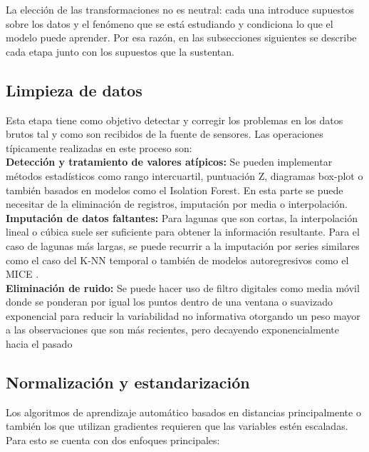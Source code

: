 La elección de las transformaciones no es neutral: cada una introduce supuestos sobre los datos y el fenómeno que se está estudiando y condiciona lo que el modelo puede aprender. Por esa razón, en las subsecciones siguientes se describe cada etapa junto con los supuestos que la sustentan.

\subsection{Limpieza de datos}

Esta etapa tiene como objetivo detectar y corregir los problemas en los datos brutos tal y como son recibidos de la fuente de sensores. Las operaciones típicamente realizadas en este proceso son:\\[.15cm]

\textbf{Detección y tratamiento de valores atípicos:} Se pueden implementar métodos estadísticos como rango intercuartil, puntuación Z, diagramas box-plot o también basados en modelos como el Isolation Forest. En esta parte se puede necesitar de la eliminación de registros, imputación por media o interpolación.\\[.15cm]

\textbf{Imputación de datos faltantes:} Para lagunas que son cortas, la interpolación lineal o cúbica suele ser suficiente para obtener la información resultante. Para el caso de lagunas más largas, se puede recurrir a la imputación por series similares como el caso del K-NN temporal \cite{oehmcke2016} o también de modelos autoregresivos como el MICE \cite{vanbuuren2011}.\\[.15cm]

\textbf{Eliminación de ruido:} Se puede hacer uso de filtro digitales como media móvil donde se ponderan por igual los puntos dentro de una ventana o suavizado exponencial para reducir la variabilidad no informativa otorgando un peso mayor a las observaciones que son más recientes, pero decayendo exponencialmente hacia el pasado \cite{nielsen2019}\\[.15cm]

\subsection{Normalización y estandarización}

Los algoritmos de aprendizaje automático basados en distancias principalmente o también los que utilizan gradientes requieren que las variables estén escaladas. Para esto se cuenta con dos enfoques principales:\\[.15cm]

